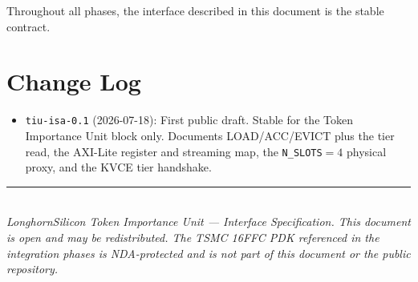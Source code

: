 \documentclass[11pt]{article}
\begin{document}
\noindent Throughout all phases, the interface described in this document is the
stable contract.

\section{Change Log}
\label{sec:changelog}

\begin{itemize}
\item \texttt{tiu-isa-0.1} (2026-07-18): First public draft. Stable for the Token
      Importance Unit block only. Documents LOAD/ACC/EVICT plus the tier read,
      the AXI-Lite register and streaming map, the \texttt{N\_SLOTS}$=4$ physical
      proxy, and the KVCE tier handshake.
\end{itemize}

\vspace{0.5in}
\noindent\rule{\textwidth}{0.4pt}\\
\noindent\small\textit{LonghornSilicon Token Importance Unit --- Interface
Specification. This document is open and may be redistributed. The TSMC 16FFC PDK
referenced in the integration phases is NDA-protected and is not part of this
document or the public repository.}
\end{document}
